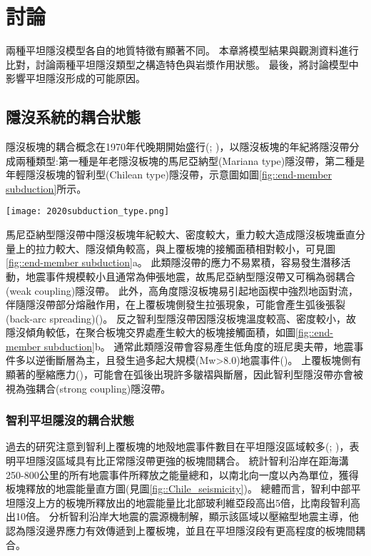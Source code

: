 
\chapter{討論}

兩種平坦隱沒模型各自的地質特徵有顯著不同。
本章將模型結果與觀測資料進行比對，討論兩種平坦隱沒類型之構造特色與岩漿作用狀態。
最後，將討論模型中影響平坦隱沒形成的可能原因。

\section{隱沒系統的耦合狀態}
隱沒板塊的耦合概念在1970年代晚期開始盛行(\citealp{uyeda1979back}; \citealp{ruff1980seismicity})，\citet{uyeda1979back}以隱沒板塊的年紀將隱沒帶分成兩種類型:第一種是年老隱沒板塊的馬尼亞納型(Mariana type)隱沒帶，第二種是年輕隱沒板塊的智利型(Chilean type)隱沒帶，示意圖如圖\ref{fig::end-member subduction}所示。
\begin{figure*}[htp]
    \centering
    \texttt{[image: 2020subduction\_type.png]}
    \caption[隱沒帶的兩種型態示意圖，摘自\citet{Yan2020}]{隱沒帶的兩種型態示意圖，摘自\citet{Yan2020}。(a)馬尼亞納型隱沒帶(b)智利型隱沒帶}
    \label{fig::end-member subduction}
\end{figure*}

馬尼亞納型隱沒帶中隱沒板塊年紀較大、密度較大，重力較大造成隱沒板塊垂直分量上的拉力較大、隱沒傾角較高，與上覆板塊的接觸面積相對較小，可見圖\ref{fig::end-member subduction}a。
此類隱沒帶的應力不易累積，容易發生潛移活動，地震事件規模較小且通常為伸張地震，故馬尼亞納型隱沒帶又可稱為弱耦合(weak coupling)隱沒帶。
此外，高角度隱沒板塊易引起地函楔中強烈地函對流，伴隨隱沒帶部分熔融作用，在上覆板塊側發生拉張現象，可能會產生弧後張裂(back-arc spreading)(\citealp{lallemand2005relationships})。
反之智利型隱沒帶因隱沒板塊溫度較高、密度較小，故隱沒傾角較低，在聚合板塊交界處產生較大的板塊接觸面積，如圖\ref{fig::end-member subduction}b。
通常此類隱沒帶會容易產生低角度的班尼奧夫帶，地震事件多以逆衝斷層為主，且發生過多起大規模(Mw>8.0)地震事件(\citealp{uyeda1979back})。
上覆板塊側有顯著的壓縮應力(\citealp{hu2021southward})，可能會在弧後出現許多皺褶與斷層，因此智利型隱沒帶亦會被視為強耦合(strong coupling)隱沒帶。

\subsection{智利平坦隱沒的耦合狀態}
過去的研究注意到智利上覆板塊的地殼地震事件數目在平坦隱沒區域較多(\citealp{jordan1983andean}; \citealp{smalley1993basement})，表明平坦隱沒區域具有比正常隱沒帶更強的板塊間耦合。
\citet{gutscher2002andean}統計智利沿岸在距海溝250-800公里的所有地震事件所釋放之能量總和，以南北向一度以內為單位，獲得板塊釋放的地震能量直方圖(見圖\ref{fig::Chile_seismicity})。
總體而言，智利中部平坦隱沒上方的板塊所釋放出的地震能量比北部玻利維亞段高出5倍，比南段智利高出10倍。
\citet{jordan1983andean}分析智利沿岸大地震的震源機制解，顯示該區域以壓縮型地震主導，他認為隱沒邊界應力有效傳遞到上覆板塊，並且在平坦隱沒段有更高程度的板塊間耦合。


